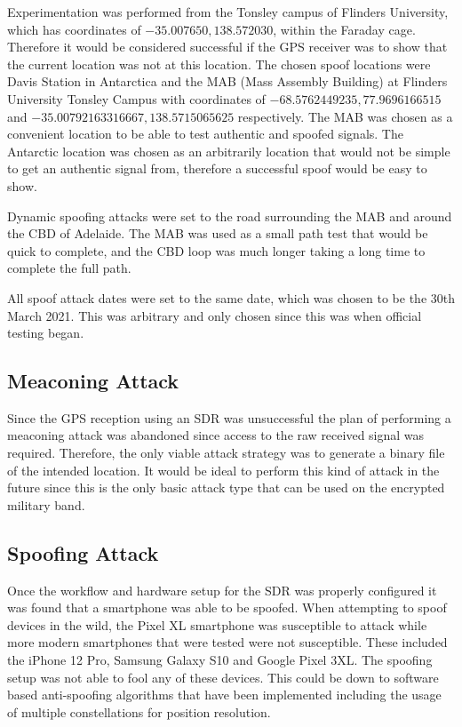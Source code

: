 Experimentation was performed from the Tonsley campus of Flinders University, which has coordinates of $-35.007650, 138.572030$, within the Faraday cage. Therefore it would
be considered successful if the GPS receiver was to show that the current location was not at this location. The chosen spoof locations were Davis Station in
Antarctica and the MAB (Mass Assembly Building) at Flinders University Tonsley Campus with coordinates of $-68.5762449235, 77.9696166515$ and $-35.00792163316667, 138.5715065625$ respectively.
The MAB was chosen as a convenient location to be able to test authentic and spoofed signals. The Antarctic location was chosen as an arbitrarily location that would
not be simple to get an authentic signal from, therefore a successful spoof would be easy to show.

Dynamic spoofing attacks were set to the road surrounding the MAB and around the CBD of Adelaide. The MAB was used as a small path test that would be quick to complete,
and the CBD loop was much longer taking a long time to complete the full path.


All spoof attack dates were set to the same date, which was chosen to be
the 30th March 2021. This was arbitrary and only chosen since this was when official testing began.

\subsection{Meaconing Attack}
Since the GPS reception using an SDR was unsuccessful the plan of performing a meaconing attack was abandoned since access to the raw received signal was required.
Therefore, the only viable attack strategy was to generate a binary file of the intended location. It would be ideal to perform this kind of attack in the future since
this is the only basic attack type that can be used on the encrypted military band.

\subsection{Spoofing Attack}
Once the workflow and hardware setup for the SDR was properly configured it was found that a smartphone was able to be spoofed.
When attempting to spoof devices in the wild, the Pixel XL smartphone was susceptible to attack while more modern smartphones that were tested were not susceptible. These
included the iPhone 12 Pro, Samsung Galaxy S10 and Google Pixel 3XL. The spoofing setup was not able to fool any of these devices. This could be down to software based
anti-spoofing algorithms that have been implemented including the usage of multiple constellations for position resolution.

